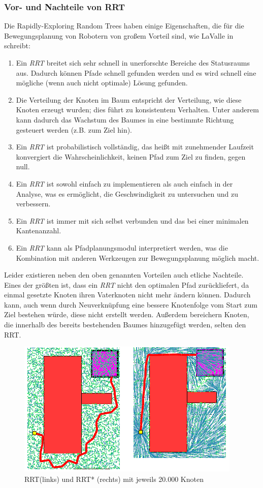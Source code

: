 \subsubsection{Vor- und Nachteile von RRT}
Die Rapidly-Exploring Random Trees haben einige Eigenschaften, die für die Bewegungsplanung von Robotern von großem Vorteil sind, wie LaValle in  \citep[Kapitel 3 in][]{Lav98} schreibt:
\begin{enumerate}
\item Ein \textit{RRT} breitet sich sehr schnell in unerforschte Bereiche des Statusraums aus. Dadurch können Pfade schnell gefunden werden und es wird schnell eine mögliche (wenn auch nicht optimale) Lösung gefunden.
\item Die Verteilung der Knoten im Baum entspricht der Verteilung, wie diese Knoten erzeugt wurden; dies führt zu konsistentem Verhalten. Unter anderem kann dadurch das Wachstum des Baumes in eine bestimmte Richtung gesteuert werden (z.B. zum Ziel hin).
\item Ein \textit{RRT} ist probabilistisch vollständig, das heißt mit zunehmender Laufzeit konvergiert die Wahrscheinlichkeit, keinen Pfad zum Ziel zu finden, gegen null.
\item Ein \textit{RRT} ist sowohl einfach zu implementieren als auch einfach in der Analyse, was es ermöglicht, die Geschwindigkeit zu untersuchen und zu verbessern.
\item Ein \textit{RRT} ist immer mit sich selbst verbunden und das bei einer minimalen Kantenanzahl.
\item Ein \textit{RRT} kann als Pfadplanungsmodul interpretiert werden, was die Kombination mit anderen Werkzeugen zur Bewegungsplanung möglich macht.
\end{enumerate}
Leider existieren neben den oben genannten Vorteilen auch etliche Nachteile. Eines der größten ist, dass ein \textit{RRT} nicht den optimalen Pfad zurückliefert, da einmal gesetzte Knoten ihren Vaterknoten nicht mehr ändern können. Dadurch kann, auch wenn durch Neuverknüpfung eine bessere Knotenfolge vom Start zum Ziel bestehen würde, diese nicht erstellt werden. Außerdem bereichern Knoten, die innerhalb des bereits bestehenden Baumes hinzugefügt werden, selten den RRT.\\

\begin{figure}[htb]
    \centering
   \label{fig:fig7}   
 \includegraphics[scale=1]{Bilder/RRT_RRT_star.png} 
 \caption{RRT(links) und RRT* (rechts) mit jeweils 20.000 Knoten}
      
\end{figure}

